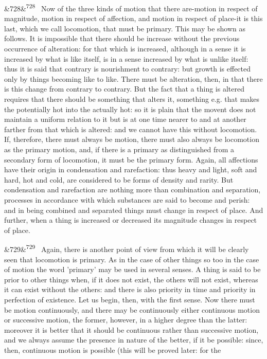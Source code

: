 \documentclass[12pt]{article}
\newcommand{\para}[1][]{\par\noindent\ifx&#1&\else\textsuperscript{\footnotesize #1}~\fi}
\begin{document}
\para[728] Now of the three kinds of motion that there are-motion in respect of magnitude, motion in respect of affection, and motion in respect of place-it is this last, which we call locomotion, that must be primary. This may be shown as follows. It is impossible that there should be increase without the previous occurrence of alteration: for that which is increased, although in a sense it is increased by what is like itself, is in a sense increased by what is unlike itself: thus it is said that contrary is nourishment to contrary: but growth is effected only by things becoming like to like. There must be alteration, then, in that there is this change from contrary to contrary. But the fact that a thing is altered requires that there should be something that alters it, something e.g. that makes the potentially hot into the actually hot: so it is plain that the movent does not maintain a uniform relation to it but is at one time nearer to and at another farther from that which is altered: and we cannot have this without locomotion. If, therefore, there must always be motion, there must also always be locomotion as the primary motion, and, if there is a primary as distinguished from a secondary form of locomotion, it must be the primary form. Again, all affections have their origin in condensation and rarefaction: thus heavy and light, soft and hard, hot and cold, are considered to be forms of density and rarity. But condensation and rarefaction are nothing more than combination and separation, processes in accordance with which substances are said to become and perish: and in being combined and separated things must change in respect of place. And further, when a thing is increased or decreased its magnitude changes in respect of place.

\para[729] Again, there is another point of view from which it will be clearly seen that locomotion is primary. As in the case of other things so too in the case of motion the word 'primary' may be used in several senses. A thing is said to be prior to other things when, if it does not exist, the others will not exist, whereas it can exist without the others: and there is also priority in time and priority in perfection of existence. Let us begin, then, with the first sense. Now there must be motion continuously, and there may be continuously either continuous motion or successive motion, the former, however, in a higher degree than the latter: moreover it is better that it should be continuous rather than successive motion, and we always assume the presence in nature of the better, if it be possible: since, then, continuous motion is possible (this will be proved later: for the
\end{document}
